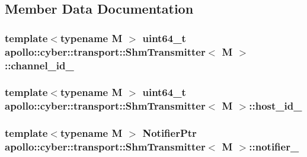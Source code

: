 \subsection{Member Data Documentation}
\hypertarget{classapollo_1_1cyber_1_1transport_1_1ShmTransmitter_acf81c9fa97f65a949ce4c8cfbb7ed7db}{
\subsubsection[{channel\-\_\-id\-\_\-}]{\setlength{\rightskip}{0pt plus 5cm}template$<$typename M $>$ uint64\-\_\-t {\bf apollo\-::cyber\-::transport\-::\-Shm\-Transmitter}$<$ M $>$\-::channel\-\_\-id\-\_\-\hspace{0.3cm}{\ttfamily [private]}}}\label{classapollo_1_1cyber_1_1transport_1_1ShmTransmitter_acf81c9fa97f65a949ce4c8cfbb7ed7db}
\hypertarget{classapollo_1_1cyber_1_1transport_1_1ShmTransmitter_ab392a50b184f87144a1f00207b51ff62}{
\subsubsection[{host\-\_\-id\-\_\-}]{\setlength{\rightskip}{0pt plus 5cm}template$<$typename M $>$ uint64\-\_\-t {\bf apollo\-::cyber\-::transport\-::\-Shm\-Transmitter}$<$ M $>$\-::host\-\_\-id\-\_\-\hspace{0.3cm}{\ttfamily [private]}}}\label{classapollo_1_1cyber_1_1transport_1_1ShmTransmitter_ab392a50b184f87144a1f00207b51ff62}
\hypertarget{classapollo_1_1cyber_1_1transport_1_1ShmTransmitter_acb9ca393283d51f5464b291eb355aef7}{
\subsubsection[{notifier\-\_\-}]{\setlength{\rightskip}{0pt plus 5cm}template$<$typename M $>$ {\bf Notifier\-Ptr} {\bf apollo\-::cyber\-::transport\-::\-Shm\-Transmitter}$<$ M $>$\-::notifier\-\_\-\hspace{0.3cm}{\ttfamily [private]}}}\label{classapollo_1_1cyber_1_1transport_1_1ShmTransmitter_acb9ca393283d51f5464b291eb355aef7}
